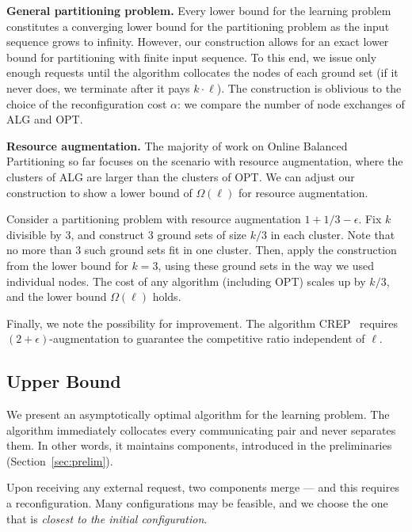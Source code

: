 \documentclass[manuscript,screen=true, review, anonymous]{acmart}
\newcommand{\OPT}{\textsf{OPT}\xspace}
\newcommand{\ALG}{\textsf{ALG}\xspace}
\begin{document}
\noindent
\textbf{General partitioning problem.}
Every lower bound for the learning problem constitutes a converging lower bound for the partitioning problem as the input sequence grows to infinity.
However, our construction allows for an exact lower bound for partitioning with finite input sequence.
To this end, we issue only enough requests until the algorithm collocates the nodes of each ground set (if it never does, we terminate after it pays $k\cdot \ell$).
The construction is oblivious to the choice of the reconfiguration cost $\alpha$: we compare the 	number of node exchanges of \ALG and \OPT.



\noindent
\textbf{Resource augmentation.}
The majority of work on Online Balanced Partitioning so far \cite{repartition-disc,sigmetrics19_partitioning} focuses on the scenario with resource augmentation, where the clusters of \ALG are larger than the clusters of \OPT.
We can adjust our construction to show a lower bound of $\Omega(\ell)$ for resource augmentation.

Consider a partitioning problem with resource augmentation $1+1/3-\epsilon$.
Fix $k$ divisible by $3$, and construct $3$ ground sets of size $k/3$ in each cluster.
Note that no more than $3$ such ground sets fit in one cluster.
Then, apply the construction from the lower bound for $k=3$, using these ground sets in the way we used individual nodes.
The cost of any algorithm (including \OPT) scales up by $k/3$, and the lower bound $\Omega(\ell)$ holds.

Finally, we note the possibility for improvement. The algorithm CREP~\cite{repartition-disc} requires $(2+\epsilon)$-augmentation to guarantee the competitive ratio independent of $\ell$.

\subsection{Upper Bound}
\label{sec:ppl}

We present an asymptotically optimal algorithm for the learning problem.
The algorithm immediately collocates every communicating pair and never separates them.
In other words, it maintains components, introduced in the preliminaries (Section~\ref{sec:prelim}).

Upon receiving any external request, two components merge --- and this requires a reconfiguration.
Many configurations may be feasible, and we choose the one that is \emph{closest to the initial configuration}.
\end{document}
